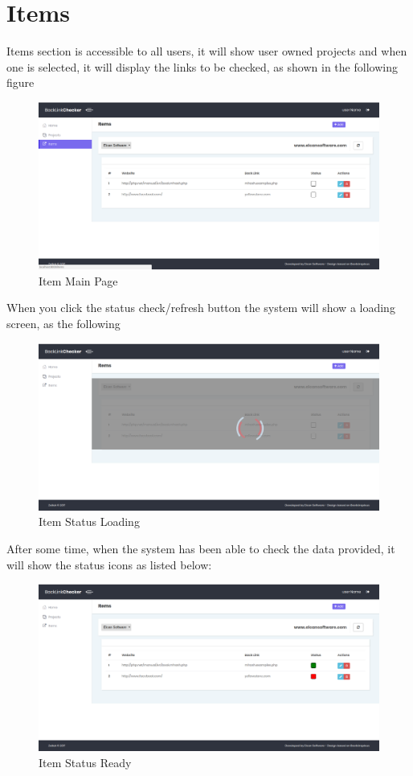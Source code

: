 \section{Items}

\label{sec:item}
Items section is accessible to all users, it will show user owned projects and when one is selected, it will display the links to be checked, as shown in the following figure
\begin{figure}[H]
	\caption{Item Main Page}
	\label{img:itmmain}
	\includegraphics[width=\textwidth]{images/items_main}
\end{figure}

When you click the status check/refresh button the system will show a loading screen, as the following
\begin{figure}[H]
	\caption{Item Status Loading}
	\label{img:itmload}
	\includegraphics[width=\textwidth]{images/items_loading}
\end{figure}

After some time, when the system has been able to check the data provided, it will show the status icons as listed below:
\begin{figure}[H]
	\caption{Item Status Ready}
	\label{img:itmstat}
	\includegraphics[width=\textwidth]{images/items_status}
\end{figure}

